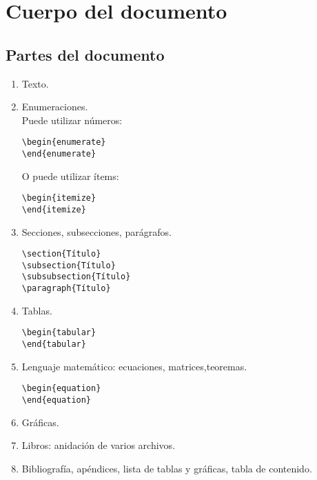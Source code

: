 \documentclass[onecolumn]{article}
\begin{document}
\section{Cuerpo del documento}\label{cuerpo-documento}
\subsection{Partes del documento}

\begin{enumerate}
\item Texto.
\item Enumeraciones.\\
Puede utilizar números:
\begin{verbatim}
\begin{enumerate}
\end{enumerate}
\end{verbatim}
O puede utilizar ítems:
\begin{verbatim}
\begin{itemize}
\end{itemize}
\end{verbatim}
\item Secciones, subsecciones, parágrafos.
\begin{verbatim}
\section{Título}
\subsection{Título}
\subsubsection{Título}
\paragraph{Título}
\end{verbatim}

\item Tablas.
\begin{verbatim}
\begin{tabular}
\end{tabular}
\end{verbatim}

\item Lenguaje matemático: ecuaciones, matrices,teoremas. 
\begin{verbatim}
\begin{equation}
\end{equation}
\end{verbatim}
\item Gráficas.
\item Libros: anidación de varios archivos.
\item Bibliografía, apéndices, lista de tablas y gráficas, tabla de contenido.
\end{enumerate}
\end{document}
